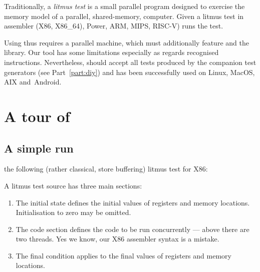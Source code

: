 Traditionally, a \emph{litmus test} is a small parallel program designed
to exercise the memory model of a parallel, shared-memory, computer.
Given a litmus test in assembler (X86, X86\_64), Power, ARM, MIPS, RISC-V) \litmus{}
runs the test.

Using \litmus{} thus requires a parallel machine,
which must additionally feature  and the  library.
Our tool \litmus{} has some limitations especially
as regards recognised instructions.
Nevertheless, \litmus{} should accept all tests
produced by the companion test generators (see Part~\ref{part:diy})
and has been successfully used on Linux, MacOS, AIX and~Android.


\section{A tour of~\litmus{}}

\subsection{A \label{litmus:simple} simple run}
 the following (rather classical, store buffering)
 litmus test for X86:

A litmus test source has three main sections:
\begin{enumerate}
\item The initial state defines the initial values of registers
and memory locations. Initialisation to zero may be omitted.
\item The code section defines the code to be run concurrently
--- above there are two threads.
Yes we know, our X86 assembler syntax is a mistake.
\item The final condition applies to the final values
of registers and memory locations.
\end{enumerate}


